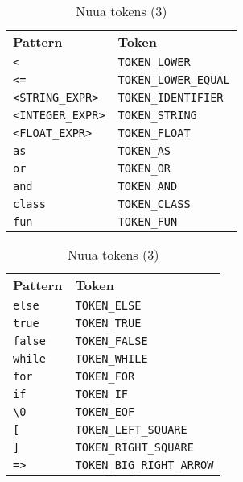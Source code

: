 \begin{table}[H]
	\centering
	\begin{subtable}{0.45\textwidth}
		\centering
        \begin{tabular}{ l l }
            \textbf{Pattern} & \textbf{Token} \\
            \texttt{<} & \texttt{TOKEN\_LOWER} \\
            \texttt{<=} & \texttt{TOKEN\_LOWER\_EQUAL} \\
            \texttt{<STRING\_EXPR>} & \texttt{TOKEN\_IDENTIFIER} \\
            \texttt{<INTEGER\_EXPR>} & \texttt{TOKEN\_STRING} \\
            \texttt{<FLOAT\_EXPR>} & \texttt{TOKEN\_FLOAT} \\
            \texttt{as} & \texttt{TOKEN\_AS} \\
            \texttt{or} & \texttt{TOKEN\_OR} \\
            \texttt{and} & \texttt{TOKEN\_AND} \\
            \texttt{class} & \texttt{TOKEN\_CLASS} \\
            \texttt{fun} & \texttt{TOKEN\_FUN} \\
		\end{tabular}
		\caption{}
	\end{subtable}
	\begin{subtable}{0.45\textwidth}
		\centering
        \begin{tabular}{ l l }
            \textbf{Pattern} & \textbf{Token} \\
            \texttt{else} & \texttt{TOKEN\_ELSE} \\
            \texttt{true} & \texttt{TOKEN\_TRUE} \\
            \texttt{false} & \texttt{TOKEN\_FALSE} \\
            \texttt{while} & \texttt{TOKEN\_WHILE} \\
            \texttt{for} & \texttt{TOKEN\_FOR} \\
            \texttt{if} & \texttt{TOKEN\_IF} \\
            \texttt{\textbackslash 0} & \texttt{TOKEN\_EOF} \\
            \texttt{[} & \texttt{TOKEN\_LEFT\_SQUARE} \\
            \texttt{]} & \texttt{TOKEN\_RIGHT\_SQUARE} \\
            \texttt{=>} & \texttt{TOKEN\_BIG\_RIGHT\_ARROW} \\
		\end{tabular}
		\caption{}
	\end{subtable}
	\caption{Nuua tokens (3)}
    \label{fig:nuua_tokens_3}
\end{table}


